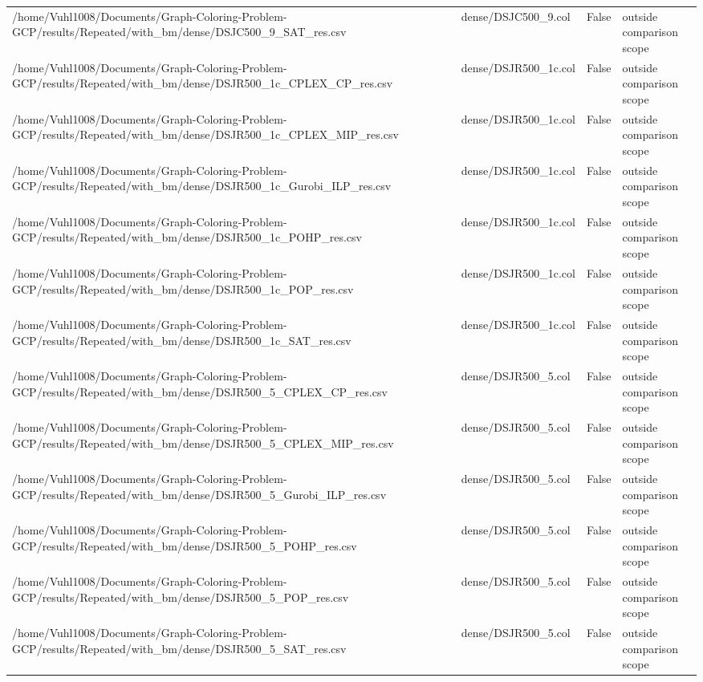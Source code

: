 \begin{table}[htbp]
\begin{tabular}{llll}
/home/Vuhl1008/Documents/Graph-Coloring-Problem-GCP/results/Repeated/with\_bm/dense/DSJC500\_9\_SAT\_res.csv & dense/DSJC500\_9.col & False & outside comparison scope \\
/home/Vuhl1008/Documents/Graph-Coloring-Problem-GCP/results/Repeated/with\_bm/dense/DSJR500\_1c\_CPLEX\_CP\_res.csv & dense/DSJR500\_1c.col & False & outside comparison scope \\
/home/Vuhl1008/Documents/Graph-Coloring-Problem-GCP/results/Repeated/with\_bm/dense/DSJR500\_1c\_CPLEX\_MIP\_res.csv & dense/DSJR500\_1c.col & False & outside comparison scope \\
/home/Vuhl1008/Documents/Graph-Coloring-Problem-GCP/results/Repeated/with\_bm/dense/DSJR500\_1c\_Gurobi\_ILP\_res.csv & dense/DSJR500\_1c.col & False & outside comparison scope \\
/home/Vuhl1008/Documents/Graph-Coloring-Problem-GCP/results/Repeated/with\_bm/dense/DSJR500\_1c\_POHP\_res.csv & dense/DSJR500\_1c.col & False & outside comparison scope \\
/home/Vuhl1008/Documents/Graph-Coloring-Problem-GCP/results/Repeated/with\_bm/dense/DSJR500\_1c\_POP\_res.csv & dense/DSJR500\_1c.col & False & outside comparison scope \\
/home/Vuhl1008/Documents/Graph-Coloring-Problem-GCP/results/Repeated/with\_bm/dense/DSJR500\_1c\_SAT\_res.csv & dense/DSJR500\_1c.col & False & outside comparison scope \\
/home/Vuhl1008/Documents/Graph-Coloring-Problem-GCP/results/Repeated/with\_bm/dense/DSJR500\_5\_CPLEX\_CP\_res.csv & dense/DSJR500\_5.col & False & outside comparison scope \\
/home/Vuhl1008/Documents/Graph-Coloring-Problem-GCP/results/Repeated/with\_bm/dense/DSJR500\_5\_CPLEX\_MIP\_res.csv & dense/DSJR500\_5.col & False & outside comparison scope \\
/home/Vuhl1008/Documents/Graph-Coloring-Problem-GCP/results/Repeated/with\_bm/dense/DSJR500\_5\_Gurobi\_ILP\_res.csv & dense/DSJR500\_5.col & False & outside comparison scope \\
/home/Vuhl1008/Documents/Graph-Coloring-Problem-GCP/results/Repeated/with\_bm/dense/DSJR500\_5\_POHP\_res.csv & dense/DSJR500\_5.col & False & outside comparison scope \\
/home/Vuhl1008/Documents/Graph-Coloring-Problem-GCP/results/Repeated/with\_bm/dense/DSJR500\_5\_POP\_res.csv & dense/DSJR500\_5.col & False & outside comparison scope \\
/home/Vuhl1008/Documents/Graph-Coloring-Problem-GCP/results/Repeated/with\_bm/dense/DSJR500\_5\_SAT\_res.csv & dense/DSJR500\_5.col & False & outside comparison scope \\

\end{tabular}
\end{table}
